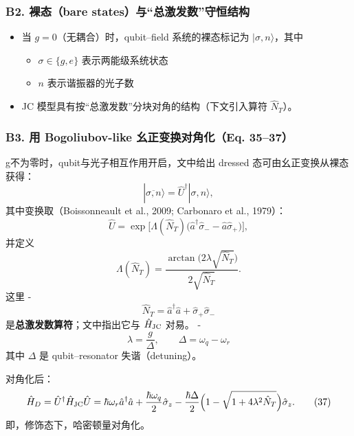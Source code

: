 \documentclass[12pt,a4paper,oneside]{ctexbook}
\providecommand{\tightlist}{%
  \setlength{\itemsep}{0pt}\setlength{\parskip}{0pt}}
\begin{document}
\subsubsection{\texorpdfstring{\textbf{B2. 裸态（bare
states）与``总激发数''守恒结构}}{B2. 裸态（bare states）与``总激发数''守恒结构}}\label{b2.-ux88f8ux6001bare-statesux4e0eux603bux6fc0ux53d1ux6570ux5b88ux6052ux7ed3ux6784}

\begin{itemize}
\tightlist
\item
  当 \(g=0\)（无耦合）时，qubit--field 系统的裸态标记为
  \(|\sigma,n\rangle\)，其中

  \begin{itemize}
  \tightlist
  \item
    \(\sigma\in\{g,e\}\) 表示两能级系统状态\\
  \item
    \(n\) 表示谐振器的光子数
  \end{itemize}
\item
  JC 模型具有按``总激发数''分块对角的结构（下文引入算符 \(\hat N_T\)）。
\end{itemize}

\subsubsection{\texorpdfstring{\textbf{B3. 用 Bogoliubov-like
幺正变换对角化（Eq.
35--37）}}{B3. 用 Bogoliubov-like 幺正变换对角化（Eq. 35--37）}}\label{b3.-ux7528-bogoliubov-like-ux5e7aux6b63ux53d8ux6362ux5bf9ux89d2ux5316eq.-3537}

g不为零时，qubit与光子相互作用开启，文中给出 dressed 态可由幺正变换从裸态获得： \[
|\overline{\sigma,n}\rangle=\hat U^\dagger|\sigma,n\rangle,
\] 其中变换取（Boissonneault et al., 2009; Carbonaro et al., 1979）： \[
\hat U=\exp\!\Big[\Lambda(\hat N_T)\big(\hat a^\dagger\hat\sigma_- - \hat a\hat\sigma_+\big)\Big],
\tag{35}
\] 并定义 \[
\Lambda(\hat N_T)=\frac{\arctan\!\big(2\lambda\sqrt{\hat N_T}\big)}{2\sqrt{\hat N_T}}.
\tag{36}
\] 这里 - \[
  \hat N_T=\hat a^\dagger\hat a+\hat\sigma_+\hat\sigma_-
  \] 是\textbf{总激发数算符}；文中指出它与 \(\hat H_{\rm JC}\) 对易。 -
\[
  \lambda=\frac{g}{\Delta},\qquad \Delta=\omega_q-\omega_r
  \] 其中 \(\Delta\) 是 qubit--resonator 失谐（detuning）。

对角化后： \[
\hat H_D=\hat U^\dagger \hat H_{\rm JC}\hat U
=\hbar\omega_r\hat a^\dagger\hat a
+\frac{\hbar\omega_q}{2}\hat\sigma_z
-\frac{\hbar\Delta}{2}\Big(1-\sqrt{1+4\lambda^2\hat N_T}\Big)\hat\sigma_z.
\tag{37}
\]
即，修饰态下，哈密顿量对角化。
\end{document}
